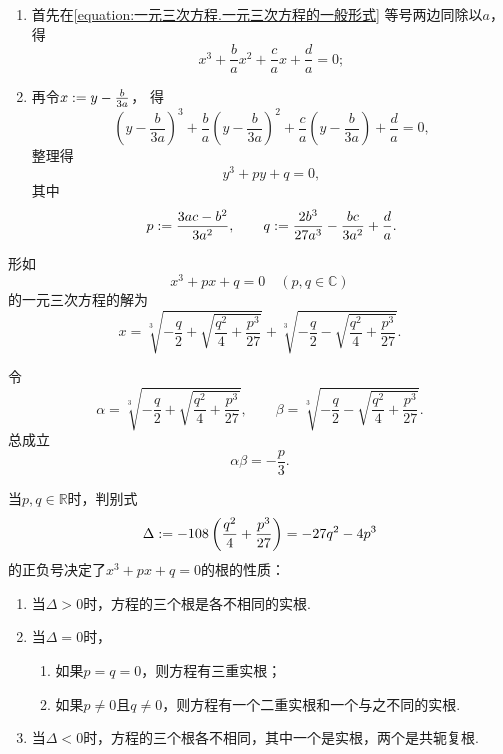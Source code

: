 \begin{algorithm}[将一元三次方程的一般形式化为标准形式]
\hfill
\begin{enumerate}
	\item 首先在\cref{equation:一元三次方程.一元三次方程的一般形式} 等号两边同除以\(a\)，
	得\begin{equation*}
		x^3 + \frac{b}{a} x^2 + \frac{c}{a} x + \frac{d}{a} = 0;
	\end{equation*}

	\item 再令\(x := y-\frac{b}{3a}\)，
	得\begin{equation*}
		\left(y-\frac{b}{3a}\right)^3
		+ \frac{b}{a} \left(y-\frac{b}{3a}\right)^2
		+ \frac{c}{a} \left(y-\frac{b}{3a}\right)
		+ \frac{d}{a}
		= 0,
	\end{equation*}
	整理得\begin{equation}
		y^3 + py + q = 0,
	\end{equation}
	其中\begin{equation*}
		p := \frac{3ac-b^2}{3a^2},
		\qquad
		q := \frac{2b^3}{27a^3}-\frac{bc}{3a^2}+\frac{d}{a}.
	\end{equation*}
\end{enumerate}
\end{algorithm}

\begin{theorem}[卡丹公式]
\def\a{-\frac{q}{2}}%
\def\d{\frac{q^2}{4}+\frac{p^3}{27}}
\def\b{\sqrt{\d}}%
\def\c#1{\sqrt[3]{\a#1\b}}%
形如\begin{equation*}
	x^3 + px + q = 0 \quad (p,q \in \mathbb{C})
\end{equation*}的一元三次方程的解为\begin{equation*}
	x = \c{+}+\c{-}.
\end{equation*}

令\begin{equation*}
	\alpha=\c{+}, \qquad \beta=\c{-}.
\end{equation*}
总成立\begin{equation*}
	\alpha \beta = -\frac{p}{3}.
\end{equation*}

当\(p,q\in\mathbb{R}\)时，判别式\begin{equation*}
	\Delta \defeq -108\left(\d\right) = -27q^2-4p^3
\end{equation*}的正负号决定了\(x^3+px+q=0\)的根的性质：\begin{enumerate}
	\item 当\(\Delta>0\)时，方程的三个根是各不相同的实根.
	\item 当\(\Delta=0\)时，\begin{enumerate}
		\item 如果\(p=q=0\)，则方程有三重实根；
		\item 如果\(p\neq0\)且\(q\neq0\)，则方程有一个二重实根和一个与之不同的实根.
		\end{enumerate}
	\item 当\(\Delta<0\)时，方程的三个根各不相同，其中一个是实根，两个是共轭复根.
\end{enumerate}
\end{theorem}

